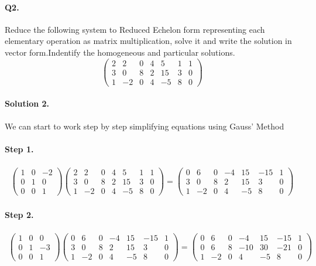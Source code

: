 \documentclass[11pt]{article}
\begin{document}
\paragraph{Q2.}Reduce the following system to Reduced Echelon form representing each elementary operation as matrix multiplication, solve it and write the solution in vector form.Indentify the homogeneous and particular solutions.
\[
\left(\begin{array}{cccccc|c}  
	2 & 2 & 0 & 4 & 5 & 1 & 1\\
    3 & 0 & 8 & 2 & 15 & 3 & 0\\
    1 & -2 & 0 & 4 & -5 & 8 & 0
\end{array}\right)
\]

\paragraph{Solution 2.}We can start to work step by step simplifying equations using Gauss' Method
\paragraph{Step 1.}
\begin{eqnarray*}
\begin{pmatrix}
	1 & 0 & -2 \\
	0 & 1 & 0 \\
	0 & 0 & 1
\end{pmatrix}
\left(\begin{array}{cccccc|c}  
	2 & 2 & 0 & 4 & 5 & 1 & 1\\
    3 & 0 & 8 & 2 & 15 & 3 & 0\\
    1 & -2 & 0 & 4 & -5 & 8 & 0
\end{array}\right)
=
\left(\begin{array}{cccccc|c}  
	0 & 6 & 0 & -4 & 15 & -15 & 1\\
    3 & 0 & 8 & 2 & 15 & 3 & 0\\
    1 & -2 & 0 & 4 & -5 & 8 & 0
\end{array}\right)
\end{eqnarray*}

\paragraph{Step 2.}
\begin{eqnarray*}
\begin{pmatrix}
	1 & 0 & 0 \\
	0 & 1 & -3 \\
	0 & 0 & 1
\end{pmatrix}
\left(\begin{array}{cccccc|c}  
	0 & 6 & 0 & -4 & 15 & -15 & 1\\
    3 & 0 & 8 & 2 & 15 & 3 & 0\\
    1 & -2 & 0 & 4 & -5 & 8 & 0
\end{array}\right)
=
\left(\begin{array}{cccccc|c}  
	0 & 6 & 0 & -4 & 15 & -15 & 1\\
    0 & 6 & 8 & -10 & 30 & -21 & 0\\
    1 & -2 & 0 & 4 & -5 & 8 & 0
\end{array}\right)
\end{eqnarray*}
\end{document}
